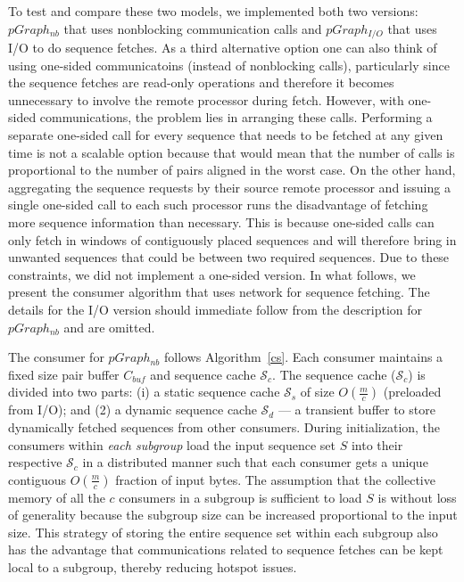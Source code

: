 \documentclass[10pt,journal,letterpaper,compsoc]{IEEEtran}
\begin{document}
To test and compare these two models, we implemented both two versions: $pGraph_{nb}$ that uses nonblocking communication calls and $pGraph_{I/O}$ that uses I/O to do sequence fetches. As a third alternative option one can also think of using one-sided communicatoins (instead of nonblocking calls), particularly since the sequence fetches are read-only operations and therefore it becomes unnecessary to involve the remote processor during fetch. However, with one-sided communications, the problem lies in arranging these calls. Performing a separate one-sided call for every sequence that needs to be fetched at any given time is not a scalable option because that would mean that the number of calls is proportional to the number of pairs aligned in the worst case. On the other hand, aggregating the sequence requests by their source remote processor and issuing a single one-sided call to each such processor runs the disadvantage of fetching more sequence information than necessary. This is because one-sided calls can only fetch in windows of contiguously placed sequences and will therefore bring in unwanted sequences that could be between two required sequences. Due to these constraints, we did not implement a one-sided version. In what follows, we present the consumer algorithm that uses network for sequence fetching. The details for the I/O version should immediate follow from the description for $pGraph_{nb}$ and are omitted. 



The consumer for $pGraph_{nb}$ follows Algorithm~\ref{cs}. Each consumer maintains a fixed size pair buffer $C_{buf}$ and sequence cache $\mathcal{S}_{c}$. The sequence cache ($\mathcal{S}_{c}$) is divided into two parts: (i) a static sequence cache $\mathcal{S}_{s}$ of size $O(\frac{m}{c})$ (preloaded from I/O); and (2) a dynamic sequence cache $\mathcal{S}_{d}$ --- a transient buffer to store dynamically fetched sequences from other consumers. During initialization, the consumers within \emph{each subgroup} load the input sequence set $S$ into their respective $\mathcal{S}_{c}$ in a distributed manner such that each consumer gets a unique contiguous $O(\frac{m}{c})$ fraction of input bytes. The assumption that the collective memory of all the $c$ consumers in a subgroup is sufficient to load $S$ is without loss of generality because the subgroup size can be increased proportional to the input size.  This strategy of storing the entire sequence set within each subgroup also has the advantage that communications related to sequence fetches can be kept local to a subgroup, thereby reducing hotspot issues.
\end{document}
